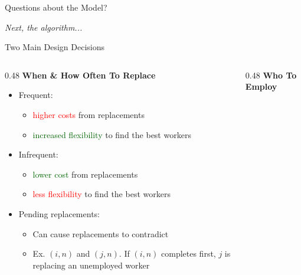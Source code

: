 \documentclass[10pt,aspectratio=169]{beamer}
\begin{document}
\begin{frame}
\centering
\vfill
{\LARGE Questions about the Model?}

\vspace{2em}
\centering
\emph{Next, the algorithm...}
\end{frame}

\begin{frame}[t]{Two Main Design Decisions}
\begin{columns}[t]
    \begin{column}{0.48\textwidth}
        \centering
        \textbf{When \& How Often To Replace}
        \vspace{0.5em}
        \raggedright
        \begin{itemize}
            \item Frequent: 
            \begin{itemize}
                \item \textcolor{red}{higher costs} from replacements
                \item \textcolor{darkgreen}{increased flexibility} to find the best workers
            \end{itemize}
            \item Infrequent: 
            \begin{itemize}
                \item \textcolor{darkgreen}{lower cost} from replacements
                \item \textcolor{red}{less flexibility} to find the best workers
            \end{itemize}
            \item Pending replacements: 
                \begin{itemize}
                    \item Can cause replacements to contradict
                    \item Ex. \((i,n)\) and \((j,n)\). If \((i,n)\) completes first, \(j\) is replacing an unemployed worker
                \end{itemize}
        \end{itemize}
    \end{column}

    \begin{column}{0.48\textwidth}
        \centering
        \textbf{Who To Employ}


\end{column}
\end{columns}
\end{frame}
\end{document}
